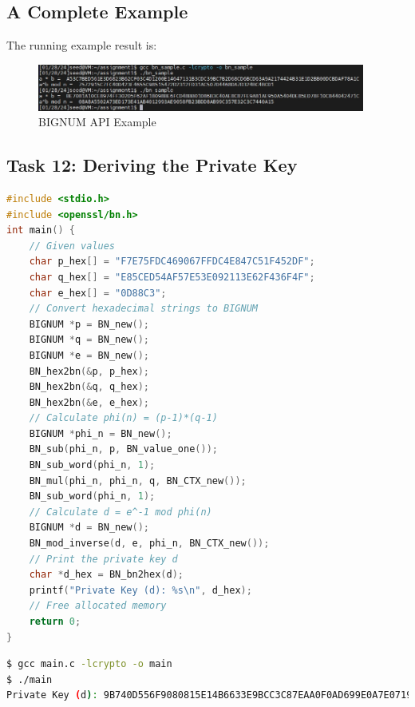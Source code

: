 \documentclass[a4paper]{article}
\begin{document}
\subsection{A Complete Example}
The running example result is:
\begin{figure}[h]
    \centering
       \includegraphics[width=0.96\textwidth]{figures/bignumresult.png}
    \caption{BIGNUM API Example}\label{fig:bignumexample}
\end{figure}

\subsection{Task 12: Deriving the Private Key}
\begin{lstlisting}[caption={C Program Code for Deriving the Private Key},label={lst:task4.12},language=C,breaklines=true]
#include <stdio.h>
#include <openssl/bn.h>
int main() {
    // Given values
    char p_hex[] = "F7E75FDC469067FFDC4E847C51F452DF";
    char q_hex[] = "E85CED54AF57E53E092113E62F436F4F";
    char e_hex[] = "0D88C3";
    // Convert hexadecimal strings to BIGNUM
    BIGNUM *p = BN_new();
    BIGNUM *q = BN_new();
    BIGNUM *e = BN_new();
    BN_hex2bn(&p, p_hex);
    BN_hex2bn(&q, q_hex);
    BN_hex2bn(&e, e_hex);
    // Calculate phi(n) = (p-1)*(q-1)
    BIGNUM *phi_n = BN_new();
    BN_sub(phi_n, p, BN_value_one());
    BN_sub_word(phi_n, 1);
    BN_mul(phi_n, phi_n, q, BN_CTX_new());
    BN_sub_word(phi_n, 1);
    // Calculate d = e^-1 mod phi(n)
    BIGNUM *d = BN_new();
    BN_mod_inverse(d, e, phi_n, BN_CTX_new());
    // Print the private key d
    char *d_hex = BN_bn2hex(d);
    printf("Private Key (d): %s\n", d_hex);
    // Free allocated memory
    return 0;
}
\end{lstlisting} 
\begin{lstlisting}[caption={Result of the Task 12},label={lst:task4.12-2},language=BASH,breaklines=true]
$ gcc main.c -lcrypto -o main
$ ./main
Private Key (d): 9B740D556F9080815E14B6633E9BCC3C87EAA0F0AD699E0A7E0719A725A94AA7
\end{lstlisting} 
\end{document}
